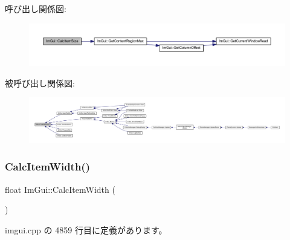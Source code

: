 呼び出し関係図\+:\nopagebreak
\begin{figure}[H]
\begin{center}
\leavevmode
\includegraphics[width=350pt]{namespace_im_gui_a3c1505e785f9571ed82500692a727c5f_cgraph}
\end{center}
\end{figure}
被呼び出し関係図\+:
\nopagebreak
\begin{figure}[H]
\begin{center}
\leavevmode
\includegraphics[width=350pt]{namespace_im_gui_a3c1505e785f9571ed82500692a727c5f_icgraph}
\end{center}
\end{figure}
\mbox{\label{namespace_im_gui_ab3b3ba92ebd8bca4a552dd93321a1994}} 
\subsubsection{\texorpdfstring{Calc\+Item\+Width()}{CalcItemWidth()}}
{\footnotesize\ttfamily float Im\+Gui\+::\+Calc\+Item\+Width (\begin{DoxyParamCaption}{ }\end{DoxyParamCaption})}



 imgui.\+cpp の 4859 行目に定義があります。

